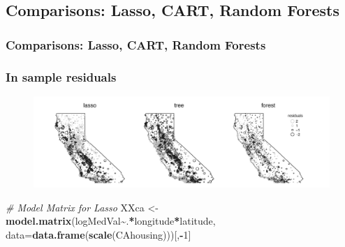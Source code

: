 \documentclass[
  shownotes,
  xcolor={svgnames},
  hyperref={colorlinks,citecolor=DarkBlue,linkcolor=DarkRed,urlcolor=DarkBlue}
  , aspectratio=169]{beamer}
\newenvironment{Shaded}{\begin{snugshade}}{\end{snugshade}}
\newcommand{\CommentTok}[1]{\textcolor[rgb]{0.56,0.35,0.01}{\textit{#1}}}
\newcommand{\DataTypeTok}[1]{\textcolor[rgb]{0.13,0.29,0.53}{#1}}
\newcommand{\DecValTok}[1]{\textcolor[rgb]{0.00,0.00,0.81}{#1}}
\newcommand{\KeywordTok}[1]{\textcolor[rgb]{0.13,0.29,0.53}{\textbf{#1}}}
\newcommand{\NormalTok}[1]{#1}
\newcommand{\OperatorTok}[1]{\textcolor[rgb]{0.81,0.36,0.00}{\textbf{#1}}}
\newcommand{\StringTok}[1]{\textcolor[rgb]{0.31,0.60,0.02}{#1}}
\begin{document}
\subsection{Comparisons: Lasso, CART, Random Forests}
\begin{frame}[fragile]
\frametitle{Comparisons: Lasso, CART, Random Forests}
\frametitle{In sample residuals}


\begin{figure}[H] \centering
            \captionsetup{justification=centering}
              \includegraphics[scale=0.25]{figures/california}
 \end{figure}

\begin{tiny}
\begin{Shaded}
\begin{Highlighting}[]
\CommentTok{\# Model Matrix for Lasso}
\NormalTok{XXca \textless{}{-}}\StringTok{ }\KeywordTok{model.matrix}\NormalTok{(logMedVal}\OperatorTok{\textasciitilde{}}\NormalTok{.}\OperatorTok{*}\NormalTok{longitude}\OperatorTok{*}\NormalTok{latitude, }
      \DataTypeTok{data=}\KeywordTok{data.frame}\NormalTok{(}\KeywordTok{scale}\NormalTok{(CAhousing)))[,}\OperatorTok{{-}}\DecValTok{1}\NormalTok{]}
\end{Highlighting}
\end{Shaded}
\end{tiny}

\end{frame}
\end{document}
